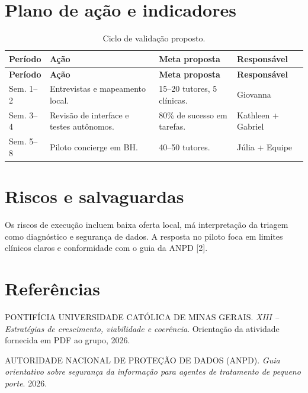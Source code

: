 \documentclass[12pt,a4paper]{article}
\begin{document}
\section{Plano de ação e indicadores}

\begin{longtable}{P{1.8cm}P{4.2cm}P{4.0cm}P{2.7cm}}
\caption{Ciclo de validação proposto.}\label{tab:plano}\\
\toprule
\textbf{Período} & \textbf{Ação} & \textbf{Meta proposta} & \textbf{Responsável} \\
\midrule
\endfirsthead
\toprule
\textbf{Período} & \textbf{Ação} & \textbf{Meta proposta} & \textbf{Responsável} \\
\midrule
\endhead
Sem. 1--2 & Entrevistas e mapeamento local. & 15--20 tutores, 5 clínicas. & Giovanna \\
Sem. 3--4 & Revisão de interface e testes autônomos. & 80\% de sucesso em tarefas. & Kathleen + Gabriel \\
Sem. 5--8 & Piloto concierge em BH. & 40--50 tutores. & Júlia + Equipe \\
\bottomrule
\end{longtable}

\section{Riscos e salvaguardas}

Os riscos de execução incluem baixa oferta local, má interpretação da triagem como diagnóstico e segurança de dados. A resposta no piloto foca em limites clínicos claros e conformidade com o guia da ANPD [2].

\clearpage
\section*{Referências}
\small
\begin{enumerate}[label={[\arabic*]},leftmargin=1.3cm,itemsep=0.2em]
\item PONTIFÍCIA UNIVERSIDADE CATÓLICA DE MINAS GERAIS. \textit{XIII -- Estratégias de crescimento, viabilidade e coerência}. Orientação da atividade fornecida em PDF ao grupo, 2026.
\item AUTORIDADE NACIONAL DE PROTEÇÃO DE DADOS (ANPD). \textit{Guia orientativo sobre segurança da informação para agentes de tratamento de pequeno porte}. 2026.
\end{enumerate}
\normalsize
\end{document}

